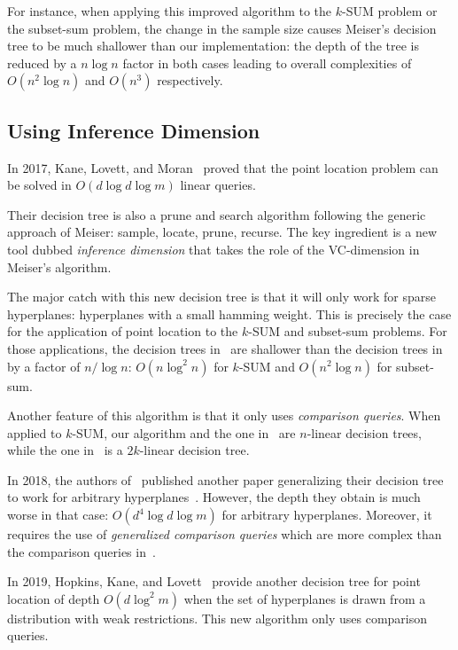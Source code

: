 For instance,
when applying this improved algorithm to the \(k\)-SUM problem or the
subset-sum problem,
the change in the sample size causes Meiser's decision tree to be
much shallower than our implementation:
the depth of the tree is reduced by a \(n \log n\) factor in both cases leading
to overall complexities of \(O(n^2 \log n)\) and \(O(n^3)\) respectively.

\subsection{Using Inference Dimension}

In 2017, Kane, Lovett, and Moran~\cite{KLM18} proved that the point location
problem can be solved in \(O(d \log d \log m)\) linear queries.

Their decision tree is also a prune and search algorithm following
the generic approach of Meiser: sample, locate,
prune, recurse. The key ingredient is a new tool dubbed \emph{inference
dimension} that takes the role of the VC-dimension in Meiser's algorithm.

The major catch with this new decision tree is that it will only work for
sparse hyperplanes: hyperplanes with a small hamming weight. This is precisely
the case for the application of point location to the \(k\)-SUM and subset-sum
problems. For those applications, the decision trees in~\cite{KLM18} are shallower than the
decision trees in~\cite{ES17} by a factor of $n / \log n$:
$O(n \log^2 n)$ for \(k\)-SUM and \(O(n^2 \log n)\) for subset-sum.

Another feature of this algorithm is that it only uses \emph{comparison
queries}. When applied to \(k\)-SUM, our algorithm and the one in~\cite{ES17} are \(n\)-linear
decision trees, while the one in~\cite{KLM18} is a \(2k\)-linear decision tree.

In 2018, the authors of~\cite{KLM18} published another paper generalizing their
decision tree to work for arbitrary hyperplanes~\cite{KLM18b}. However,
the depth they obtain is much worse in that case: $O(d^4 \log d \log m)$ for
arbitrary hyperplanes. Moreover, it requires the use of \emph{generalized
comparison queries} which are more complex than the comparison queries
in~\cite{KLM18}.

In 2019,  Hopkins, Kane, and Lovett~\cite{HKL19} provide another decision
tree for point location of depth \(O(d \log^2 m)\) when the set of
hyperplanes is drawn from a distribution with weak restrictions. This new
algorithm only uses comparison queries.

